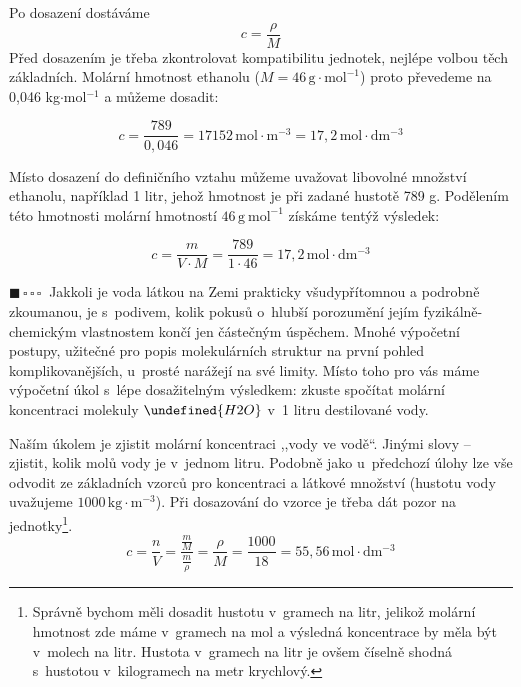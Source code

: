 \documentclass{book}
\let\ch\undefined
\newcommand{\jeden}{$\blacksquare \, \square \, \square \, \square \; \; $}
\renewenvironment{quotation}{\par}{\par} %
\begin{document}
Po dosazení dostáváme 
\[
c=\frac{\rho}{M}
\]
Před dosazením je třeba zkontrolovat kompatibilitu jednotek, nejlépe
volbou těch základních. Molární hmotnost ethanolu ($M=46\,\mathrm{g\cdot mol^{-1}}$)
proto převedeme na 0,046 kg$\cdot$mol$^{-1}$ a můžeme dosadit:

\[
c=\frac{789}{0,046}=17152\,\mathrm{mol\cdot m^{-3}}=17,2\mathrm{\,mol\cdot dm^{-3}}
\]

Místo dosazení do definičního vztahu můžeme uvažovat libovolné množství
ethanolu, například 1 litr, jehož hmotnost je při zadané hustotě 789
g. Podělením této hmotnosti molární hmotností $46\,\mathrm{g\ mol^{-1}}$
získáme tentýž výsledek:

\[
c=\frac{m}{V\cdot M} = \frac{789}{1\cdot 46} = 17,2\mathrm{\,mol\cdot dm^{-3}}
\]

\hrulefill %
\begin{quotation}
\jeden Jakkoli je voda látkou na Zemi prakticky všudypřítomnou a podrobně zkoumanou, je s~podivem, kolik pokusů o~hlubší porozumění jejím fyzikálně-chemickým vlastnostem končí jen částečným úspěchem. Mnohé výpočetní postupy, užitečné pro popis molekulárních struktur na první pohled komplikovanějších, u~prosté  narážejí na své limity.
Místo toho pro vás máme výpočetní úkol s~lépe dosažitelným výsledkem: zkuste spočítat molární koncentraci molekuly $\ch{H2O}$ v~1 litru destilované vody.
\end{quotation} \dotfill \par 
Naším úkolem je zjistit molární koncentraci ,,vody ve vodě“. Jinými slovy -- zjistit, kolik molů vody je v~jednom litru. Podobně jako u~předchozí úlohy lze vše odvodit ze základních vzorců pro koncentraci a látkové množství (hustotu vody uvažujeme $1000\, \mathrm{kg\cdot m^{-3}}$). Při dosazování do vzorce je třeba dát pozor na jednotky\footnote{Správně bychom měli dosadit hustotu v~gramech na litr, jelikož molární hmotnost zde máme v~gramech na mol a výsledná koncentrace by měla být v~molech na litr. Hustota v~gramech na litr je ovšem číselně shodná s~hustotou v~kilogramech na metr krychlový.}.
\[
c=\frac{n}{V}=\frac{\frac{m}{M}}{\frac{m}{\rho}}=\frac{\rho}{M}=\frac{1000}{18}=55,56\, \mathrm{mol\cdot dm^{-3}}
\]
\end{document}
